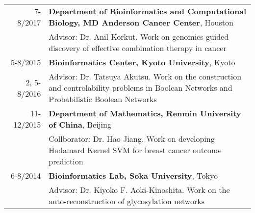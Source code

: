 \begin{longtable}{rX}
{\ \ \ } 7-8/2017  & {\bf Department of Bioinformatics and Computational Biology, MD Anderson Cancer Center}, Houston\\
&Advisor: Dr. Anil Korkut. Work on genomics-guided discovery of effective combination therapy in cancer \\
5-8/2015 & {\bf Bioinformatics Center, Kyoto University}, Kyoto \\
2, 5-8/2016 & Advisor: Dr. Tatsuya Akutsu. Work on the construction and controlability problems in Boolean Networks and Probabilistic Boolean Networks\\
11-12/2015 & \textbf{Department of Mathematics, Renmin University of China}, Beijing \\
& Collborator: Dr.  Hao Jiang. Work on developing Hadamard Kernel SVM for breast cancer outcome prediction\\
6-8/2014 & \textbf{Bioinformatics Lab, Soka University}, Tokyo \\
& Advisor: Dr. Kiyoko F. Aoki-Kinoshita. Work on the auto-reconstruction of glycosylation networks\\
\end{longtable}
